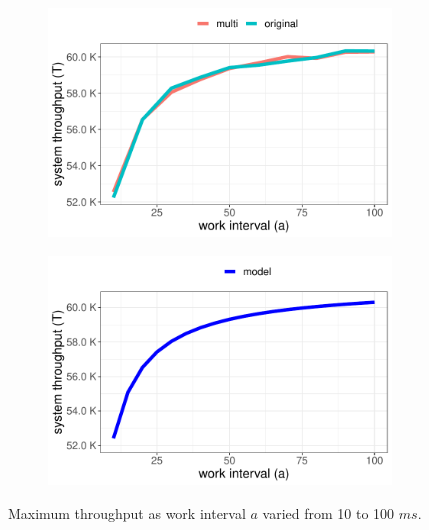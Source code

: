\begin{figure}[hbt!]
    \centering
    \begin{subfigure}{0.49\textwidth}
        \includegraphics[width=\linewidth]{figures/fig-8a.pdf}
         \label{fig:8a}
    \end{subfigure}%
    \hspace*{\fill}   
    \begin{subfigure}{0.49\textwidth}
        \includegraphics[width=\linewidth]{figures/fig-8b.pdf}
         \label{fig:8b}
    \end{subfigure}
    \caption{Maximum throughput as work interval $a$ varied from 10 to 100 $ms$.} \label{fig:8}
\end{figure}

